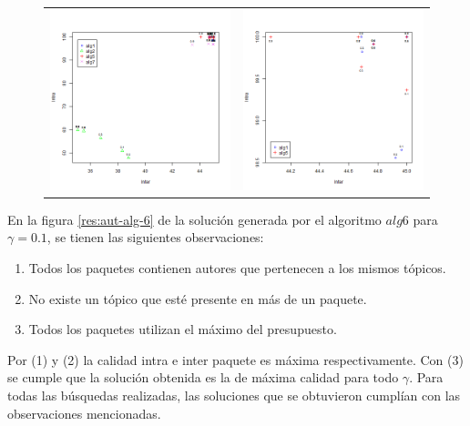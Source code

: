 \begin{figure}[H]
	\centering
	\begin{tabular}{cc}
			\includegraphics[width=0.45\linewidth]{img/aut-alg1-alg2-alg5-alg7.png}&
			\includegraphics[width=0.45\linewidth]{img/aut-alg1-alg5.png}\\
	\end{tabular}
	\caption{}
	\label{res:aut_alg1_vs_alg5_vs_alg7}
\end{figure}


En la figura \ref{res:aut-alg-6} de la solución generada por el algoritmo $alg6$ para $\gamma = 0.1$, se tienen las siguientes observaciones:
\begin{enumerate}
	\item Todos los paquetes contienen autores que pertenecen a los mismos tópicos. 
	\item No existe un tópico que esté presente en más de un paquete.
	\item Todos los paquetes utilizan el máximo del presupuesto.
\end{enumerate}
Por (1) y (2) la calidad intra e inter paquete es máxima respectivamente. Con (3) se cumple que la solución obtenida es la de máxima calidad para todo $\gamma$. Para todas las búsquedas realizadas, las soluciones que se obtuvieron cumplían con las observaciones mencionadas.


